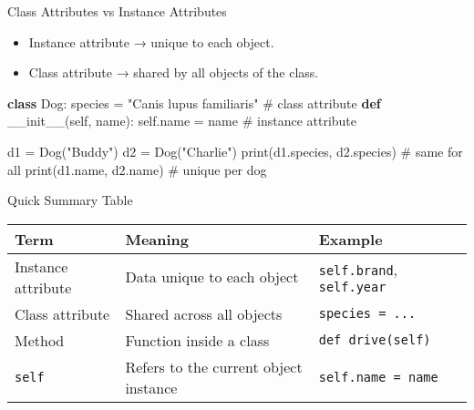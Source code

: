 \documentclass[
  letterpaper,
  DIV=11,
  numbers=noendperiod]{scrreprt}
\newenvironment{Shaded}{\begin{snugshade}}{\end{snugshade}}
\newcommand{\BuiltInTok}[1]{\textcolor[rgb]{0.00,0.23,0.31}{#1}}
\newcommand{\CommentTok}[1]{\textcolor[rgb]{0.37,0.37,0.37}{#1}}
\newcommand{\FunctionTok}[1]{\textcolor[rgb]{0.28,0.35,0.67}{#1}}
\newcommand{\KeywordTok}[1]{\textcolor[rgb]{0.00,0.23,0.31}{\textbf{#1}}}
\newcommand{\NormalTok}[1]{\textcolor[rgb]{0.00,0.23,0.31}{#1}}
\newcommand{\OperatorTok}[1]{\textcolor[rgb]{0.37,0.37,0.37}{#1}}
\newcommand{\StringTok}[1]{\textcolor[rgb]{0.13,0.47,0.30}{#1}}
\newcommand{\VariableTok}[1]{\textcolor[rgb]{0.07,0.07,0.07}{#1}}
\providecommand{\tightlist}{%
  \setlength{\itemsep}{0pt}\setlength{\parskip}{0pt}}
\begin{document}
Class Attributes vs Instance Attributes

\begin{itemize}
\tightlist
\item
  Instance attribute → unique to each object.
\item
  Class attribute → shared by all objects of the class.
\end{itemize}

\begin{Shaded}
\begin{Highlighting}[]
\KeywordTok{class}\NormalTok{ Dog:}
\NormalTok{    species }\OperatorTok{=} \StringTok{"Canis lupus familiaris"}   \CommentTok{\# class attribute}
    \KeywordTok{def} \FunctionTok{\_\_init\_\_}\NormalTok{(}\VariableTok{self}\NormalTok{, name):}
        \VariableTok{self}\NormalTok{.name }\OperatorTok{=}\NormalTok{ name                 }\CommentTok{\# instance attribute}

\NormalTok{d1 }\OperatorTok{=}\NormalTok{ Dog(}\StringTok{"Buddy"}\NormalTok{)}
\NormalTok{d2 }\OperatorTok{=}\NormalTok{ Dog(}\StringTok{"Charlie"}\NormalTok{)}
\BuiltInTok{print}\NormalTok{(d1.species, d2.species)   }\CommentTok{\# same for all}
\BuiltInTok{print}\NormalTok{(d1.name, d2.name)         }\CommentTok{\# unique per dog}
\end{Highlighting}
\end{Shaded}

Quick Summary Table

\begin{longtable}[]{@{}
  >{\raggedright\arraybackslash}p{}
  >{\raggedright\arraybackslash}p{}
  >{\raggedright\arraybackslash}p{}@{}}
\toprule\noalign{}
\begin{minipage}[b]{\linewidth}\raggedright
Term
\end{minipage} & \begin{minipage}[b]{\linewidth}\raggedright
Meaning
\end{minipage} & \begin{minipage}[b]{\linewidth}\raggedright
Example
\end{minipage} \\
\midrule\noalign{}
\endhead
\bottomrule\noalign{}
\endlastfoot
Instance attribute & Data unique to each object & \texttt{self.brand},
\texttt{self.year} \\
Class attribute & Shared across all objects &
\texttt{species\ =\ ...} \\
Method & Function inside a class & \texttt{def\ drive(self)} \\
\texttt{self} & Refers to the current object instance &
\texttt{self.name\ =\ name} \\
\end{longtable}
\end{document}
